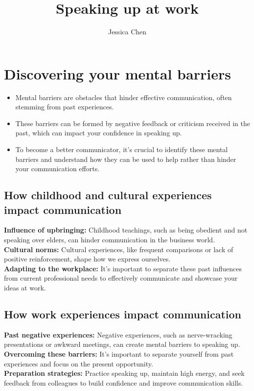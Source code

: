 \documentclass[12pt]{article}
\begin{document}

\title{\textbf{Speaking up at work}}
\author{ Jessica Chen}
\maketitle

\newpage
\tableofcontents
\newpage

\newpage
\section{Discovering  your mental barriers}
\begin{itemize}
\item{Mental barriers are obstacles that hinder effective communication, often stemming from past experiences.}
\item{These barriers can be formed by negative feedback or criticism received in the past, which can impact your confidence in speaking up.}
\item{To become a better communicator, it's crucial to identify these mental barriers and understand how they can be used to help rather than hinder your communication efforts.}
\end{itemize}
\subsection{How childhood and cultural experiences impact communication}
\textbf{Influence of upbringing:} Childhood teachings, such as being obedient and not speaking over elders, can hinder communication in the business world.\\
\textbf{Cultural norms:} Cultural experiences, like frequent comparisons or lack of positive reinforcement, shape how we express ourselves.\\
\textbf{Adapting to the workplace:} It's important to separate these past influences from current professional needs to effectively communicate and showcase your ideas at work.

\subsection{How work experiences impact communication}
\textbf{Past negative experiences:}  Negative experiences, such as nerve-wracking presentations or awkward meetings, can create mental barriers to speaking up.\\
\textbf{Overcoming these barriers:}  It's important to separate yourself from past experiences and focus on the present opportunity.\\
\textbf{Preparation strategies:}  Practice speaking up, maintain high energy, and seek feedback from colleagues to build confidence and improve communication skills.
\end{document}
